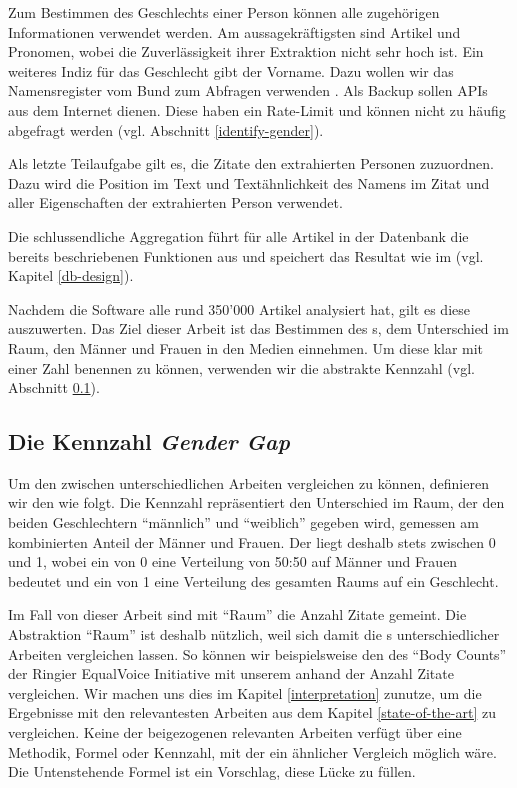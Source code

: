 Zum Bestimmen des Geschlechts einer Person können alle zugehörigen Informationen
verwendet werden. Am aussagekräftigsten sind Artikel und Pronomen, wobei die Zuverlässigkeit
ihrer Extraktion nicht sehr hoch ist. Ein weiteres Indiz für das Geschlecht gibt
der Vorname. Dazu wollen wir das Namensregister vom Bund zum Abfragen verwenden
\cite{bfs-vornamen-maennlich,bfs-vornamen-weiblich}. Als Backup sollen APIs aus dem
Internet dienen. Diese haben ein Rate-Limit und können nicht zu häufig abgefragt werden
(vgl. Abschnitt \ref{identify-gender}).

Als letzte Teilaufgabe gilt es, die Zitate den extrahierten Personen zuzuordnen.
Dazu wird die Position im Text und Textähnlichkeit des Namens im Zitat
und aller Eigenschaften der extrahierten Person verwendet.

Die schlussendliche Aggregation führt für alle Artikel in der Datenbank
die bereits beschriebenen Funktionen aus und speichert das Resultat wie im 
(vgl. Kapitel \ref{db-design}).

Nachdem die Software alle rund 350'000 Artikel analysiert hat, gilt es diese
auszuwerten. Das Ziel dieser Arbeit ist das Bestimmen des s,
dem Unterschied im Raum, den Männer und Frauen in den Medien einnehmen.
Um diese klar mit einer Zahl benennen zu können, verwenden wir die abstrakte
Kennzahl  (vgl. Abschnitt \ref{ggt-formula-section}).

\subsection{Die Kennzahl \textsl{Gender Gap}}\label{ggt-formula-section}

Um den  zwischen unterschiedlichen Arbeiten vergleichen zu können,
definieren wir den  wie folgt.
Die Kennzahl repräsentiert den Unterschied im Raum, der den beiden Geschlechtern \enquote{männlich} und
\enquote{weiblich} gegeben wird, gemessen am kombinierten Anteil der Männer und Frauen.
Der  liegt deshalb stets zwischen 0 und 1,
wobei ein  von 0 eine Verteilung von 50:50 auf Männer und Frauen bedeutet
und ein  von 1 eine Verteilung des gesamten Raums auf ein Geschlecht.

Im Fall von dieser Arbeit sind mit \enquote{Raum} die Anzahl Zitate
gemeint. Die Abstraktion \enquote{Raum} ist deshalb nützlich, weil sich damit die s
unterschiedlicher Arbeiten vergleichen lassen. So können wir beispielsweise den  des \enquote{Body Counts}
der Ringier EqualVoice Initiative \cite{ringier-equalvoice} mit unserem  anhand der
Anzahl Zitate vergleichen. Wir machen uns dies im Kapitel \ref{interpretation} zunutze, um die Ergebnisse
mit den relevantesten Arbeiten aus dem Kapitel \ref{state-of-the-art} zu vergleichen.
Keine der beigezogenen relevanten Arbeiten verfügt über eine Methodik, Formel oder Kennzahl,
mit der ein ähnlicher Vergleich möglich wäre. Die Untenstehende Formel ist ein Vorschlag,
diese Lücke zu füllen.

